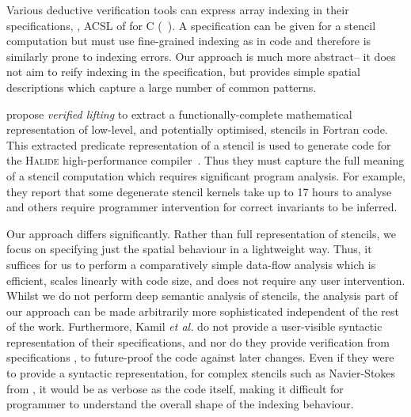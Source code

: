 Various deductive verification tools can express array indexing in their
specifications, \eg{}, ACSL of \citet{baudin2008acsl} for C
(\eg{}~\citet[Example 3.4.1]{burghardt2010acsl}). A specification can be given
for a stencil computation but must use fine-grained indexing as in code and
therefore is similarly prone to indexing errors. Our approach is much more
abstract-- it does not aim to reify indexing in the specification, but
provides simple spatial descriptions which capture a large number of common
patterns.

\citet{kamil2016verified} propose \emph{verified lifting} to extract a
functionally-complete mathematical representation of low-level, and potentially
optimised, stencils in Fortran code. This extracted predicate representation of
a stencil is used to generate code for the \textsc{Halide} high-performance
compiler~\citep{ragan2013halide}. Thus they must capture the full meaning of a
stencil computation which requires significant program analysis. For example,
they report that some degenerate stencil kernels take up to 17 hours to analyse
and others require programmer intervention for correct invariants to be
inferred.


Our approach differs significantly. Rather than full representation of stencils,
we focus on specifying just the spatial behaviour in a lightweight way.  Thus,
it suffices for us to perform a comparatively simple data-flow analysis which is
efficient, scales linearly with code size, and does not require any user
intervention.  Whilst we do not perform deep semantic analysis of stencils, the
analysis part of our approach can be made arbitrarily more sophisticated
independent of the rest of the work.
%
Furthermore, Kamil \emph{et al.} do not provide a user-visible syntactic
representation of their specifications, and nor do they provide verification
from specifications \eg{}, to future-proof the code against later changes. Even
if they were to provide a syntactic representation, for complex stencils such as
Navier-Stokes from , it would be as verbose as the code
itself, making it difficult for programmer to understand the overall shape of
the indexing behaviour.


